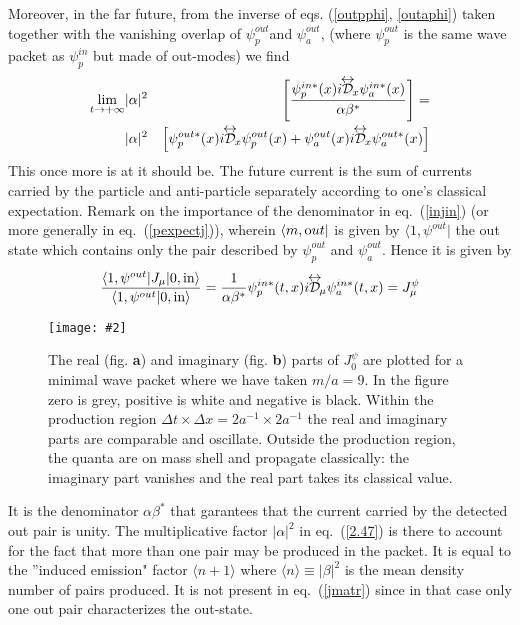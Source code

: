 \documentclass[12pt,oneside]{report}
\newcommand{\dessin}[4]
{\begin{figure}[tp]\begin{center}
\texttt{[image: \#2]}%
\end{center}
\caption{#4}
\label{#3}
\end{figure}}
\def\lrD{{{\cal D}\kern-.9em\raise1.75ex\hbox{$\leftrightarrow$}}\!}
\begin{document}
Moreover, in the far future,
 from the inverse of eqs.  (\ref{outpphi}, \ref{outaphi}) taken together
with the vanishing overlap of $\psi^{out}_p$and $\psi^{out}_a$, 
(where $\psi^{out}_p$ is the same wave packet as  $\psi^{in}_p$ but made of
out-modes) 
we find
\begin{eqnarray}
\lim_{t\to +\infty} & |\alpha|^2 & \left [ \frac{\psi^{in *}_p(x)
i \lrD_{x} \psi^{in *}_a(x)}{\alpha
\beta^*} \right]
 = \nonumber \\
& |\alpha|^2 
& \left[ \psi^{out *}_p(x) i \lrD_{x} \psi^{out}_p(x)
 + \psi^{out}_a(x) i \lrD_{x} \psi^{out *}_a(x) 
\right]
\label{2.47}
\end{eqnarray}
This once more is at it should be.  The future current is the sum of currents
carried by the particle and anti-particle separately according to one's
classical expectation.  Remark on the importance of the
denominator in eq.~(\ref{injin})  (or more generally in eq.~(\ref{pexpectj})),
wherein $\langle m, {\mbox out}\vert$  is given by
$\langle 1, \psi^{out} \vert$ the out state which contains only the
pair described by $\psi^{out}_p$ and $\psi^{out}_a$. Hence it is given by
\begin{equation}
\frac{\langle 1, \psi^{out} \vert J_{\mu} \vert 0, {\mbox{in}} \rangle}
{\langle 1, \psi^{out} \vert0, {\mbox{in}} \rangle} =
\frac {1}{\alpha \beta^*} \psi_p^{in *}(t,x) i \lrD_{\mu} \psi_a^{in *}(t,x)
= J_{\mu}^{\psi}
\label{jmatr}
\end{equation}

\newpage
\dessin{.800}{NFIG1-2.eps}{F4}
{The real (fig. {\bf a}) and imaginary (fig. {\bf b}) parts of
$J^{\psi}_0$ are plotted for a minimal wave packet 
where we have taken $m/a = 9$. In the figure
zero is grey, positive is white and negative is black. Within the
production region $\Delta t \times \Delta x = 2 a^{-1}
\times 2 a^{-1}$ the real and imaginary parts are
comparable and oscillate. Outside the production region,
the quanta are on mass shell and propagate classically: the
imaginary part vanishes and the real part takes its
classical value.
} 

It is the denominator $\alpha
\beta^*$ that garantees that the current carried by the detected out pair is 
unity. 
The multiplicative factor $|\alpha|^2$ in eq.~(\ref{2.47}) is there
to account for the
fact that more than one pair may be produced in the packet. It is equal to
the ''induced emission"
factor  $\langle n+1\rangle$ where  $\langle n\rangle \equiv |\beta|^2$ is
the mean density number of pairs
produced. It is not present in eq.~(\ref{jmatr}) since in that case only
one out pair characterizes the out-state.
\end{document}
